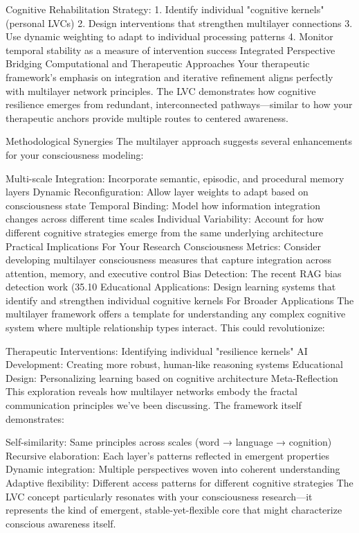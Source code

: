 {Cognitive Rehabilitation Strategy:
1. Identify individual "cognitive kernels" (personal LVCs)
2. Design interventions that strengthen multilayer connections
3. Use dynamic weighting to adapt to individual processing patterns
4. Monitor temporal stability as a measure of intervention success
Integrated Perspective
Bridging Computational and Therapeutic Approaches
Your therapeutic framework's emphasis on integration and iterative refinement aligns perfectly with multilayer network principles. The LVC demonstrates how cognitive resilience emerges from redundant, interconnected pathways—similar to how your therapeutic anchors provide multiple routes to centered awareness.

Methodological Synergies
The multilayer approach suggests several enhancements for your consciousness modeling:

Multi-scale Integration: Incorporate semantic, episodic, and procedural memory layers
Dynamic Reconfiguration: Allow layer weights to adapt based on consciousness state
Temporal Binding: Model how information integration changes across different time scales
Individual Variability: Account for how different cognitive strategies emerge from the same underlying architecture
Practical Implications
For Your Research
Consciousness Metrics: Consider developing multilayer consciousness measures that capture integration across attention, memory, and executive control
Bias Detection: The recent RAG bias detection work (35.10%
Educational Applications: Design learning systems that identify and strengthen individual cognitive kernels
For Broader Applications
The multilayer framework offers a template for understanding any complex cognitive system where multiple relationship types interact. This could revolutionize:

Therapeutic Interventions: Identifying individual "resilience kernels"
AI Development: Creating more robust, human-like reasoning systems
Educational Design: Personalizing learning based on cognitive architecture
Meta-Reflection
This exploration reveals how multilayer networks embody the fractal communication principles we've been discussing. The framework itself demonstrates:

Self-similarity: Same principles across scales (word → language → cognition)
Recursive elaboration: Each layer's patterns reflected in emergent properties
Dynamic integration: Multiple perspectives woven into coherent understanding
Adaptive flexibility: Different access patterns for different cognitive strategies
The LVC concept particularly resonates with your consciousness research—it represents the kind of emergent, stable-yet-flexible core that might characterize conscious awareness itself.

}

